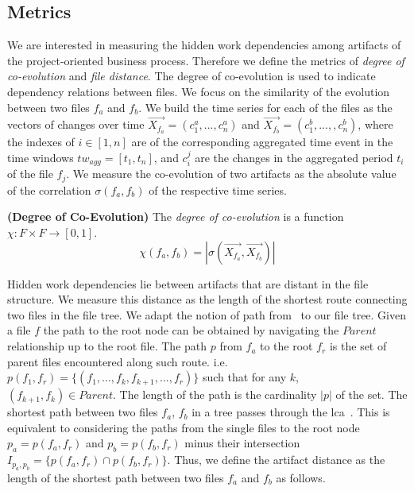 \subsection{Metrics}

We are interested in measuring the hidden work dependencies among artifacts of the project-oriented business process. Therefore we define the metrics of \emph{degree of co-evolution} and \emph{file distance}. The degree of co-evolution is used to indicate dependency relations between files. We focus on the similarity of the evolution between two files $f_a$ and $f_b$. We build the time series for each of the files as the vectors of changes over time $\vec{X_{f_a}} = (c_1^a, ..., c_n^a)$ and $\vec{X_{f_b}} = (c_1^b, ..., ,c_n^b)$, where the indexes of $i \in [1,n]$ are of the corresponding aggregated time event in the time windows $tw_{agg} = [t_1,t_n]$, and $c_i^j$ are the changes in the aggregated period $t_i$ of the file $f_j$. We measure the co-evolution of two artifacts as the absolute value of the correlation $\sigma(f_a,f_b)$ of the respective time series.

\begin{definition} {\bf (Degree of Co-Evolution)} 
	\label{definition:degree-of-coevolution}
	The \emph{degree of co-evolution} is a function $\chi: F \times F \rightarrow [0,1]$. 
	\[
	\chi(f_a,f_b) = |\sigma (\vec{X_{f_a}}, \vec{X_{f_b}})|
	\]	
\end{definition}


Hidden work dependencies lie between artifacts that are distant in the file structure. We measure this distance as the length of the shortest route connecting two files in the file tree. We adapt the notion of path from~\cite{Gubichev2010} to our file tree. Given a file $f$ the path to the root node can be obtained by navigating the $Parent$ relationship up to the root file. The path $p$ from $f_a$ to the root $f_r$ is the set of parent files encountered along such route. i.e. $p(f_1,f_{r}) = \{(f_1, ..., f_k, f_{k+1}, ..., f_{r})\}$ such that for any $k$, $(f_{k+1},f_k) \in Parent $. The length of the path is the cardinality $|p|$ of the set.
The shortest path between two files $f_a$, $f_b$ in a tree passes through the \gls{lca}~\cite{Bender2000}. This is equivalent to considering the paths from the single files to the root node $p_a = p(f_a,f_r)$ and $p_b=p(f_b, f_r)$ minus their intersection $I_{p_a,p_b}=\{p(f_a, f_r) \cap p(f_b, f_r)\}$. Thus, we define the artifact distance as the length of the shortest path between two files $f_a$ and $f_b$ as follows.

